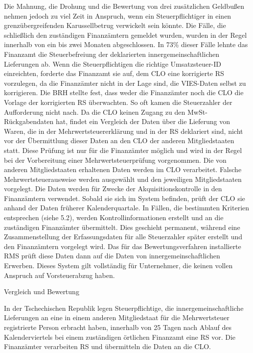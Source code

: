\documentclass[10pt]{article}
\begin{document}
Die Mahnung, die Drohung und die Bewertung von drei zusätzlichen Geldbußen nehmen jedoch zu viel Zeit in Anspruch, wenn ein Steuerpflichtiger in einen grenzübergreifenden Karussellbetrug verwickelt sein könnte.
Die Fälle, die schließlich den zuständigen Finanzämtern gemeldet wurden, wurden in der Regel innerhalb von ein bis zwei Monaten abgeschlossen.
In 73\% dieser Fälle lehnte das Finanzamt die Steuerbefreiung der deklarierten innergemeinschaftlichen Lieferungen ab.
Wenn die Steuerpflichtigen die richtige Umsatzsteuer-ID einreichten, forderte das Finanzamt sie auf, dem CLO eine korrigierte RS vorzulegen, da die Finanzämter nicht in der Lage sind, die VIES-Daten selbst zu korrigieren.
Die BRH stellte fest, dass weder die Finanzämter noch die CLO die Vorlage der korrigierten RS überwachten. So oft kamen die Steuerzahler der Aufforderung nicht nach.
Da die CLO keinen Zugang zu den MwSt-Rückgabendaten hat, findet ein Vergleich der Daten über die Lieferung von Waren, die in der Mehrwertsteuererklärung und in der RS deklariert sind, nicht vor der Übermittlung dieser Daten an den CLO der anderen Mitgliedstaaten statt.
Diese Prüfung ist nur für die Finanzämter möglich und wird in der Regel bei der Vorbereitung einer Mehrwertsteuerprüfung vorgenommen.
Die von anderen Mitgliedstaaten erhaltenen Daten werden im CLO verarbeitet.
Falsche Mehrwertsteuerausweise werden ausgewählt und den jeweiligen Mitgliedstaaten vorgelegt.
Die Daten werden für Zwecke der Akquisitionskontrolle in den Finanzämtern verwendet.
Sobald sie sich im System befinden, prüft der CLO sie anhand der Daten früherer Kalenderquartale.
In Fällen, die bestimmten Kriterien entsprechen (siehe 5.2), werden Kontrollinformationen erstellt und an die zuständigen Finanzämter übermittelt.
Dies geschieht permanent, während eine Zusammenstellung der Erfassungsdaten für alle Steuerzahler später erstellt und den Finanzämtern vorgelegt wird.
Das für das Bewertungsverfahren installierte RMS prüft diese Daten dann auf die Daten von innergemeinschaftlichen Erwerben.
Dieses System gilt vollständig für Unternehmer, die keinen vollen Anspruch auf Vorsteuerabzug haben.


Vergleich und Bewertung

In der Tschechischen Republik legen Steuerpflichtige, die innergemeinschaftliche Lieferungen an eine in einem anderen Mitgliedstaat für die Mehrwertsteuer registrierte Person erbracht haben, innerhalb von 25 Tagen nach Ablauf des Kalenderviertels bei einem zuständigen örtlichen Finanzamt eine RS vor.
Die Finanzämter verarbeiten RS und übermitteln die Daten an die CLO.
\end{document}
